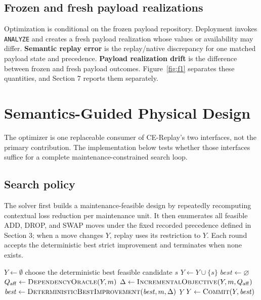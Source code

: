 \documentclass[sigconf,nonacm]{acmart}
\begin{document}
\subsection{Frozen and fresh payload realizations}

Optimization is conditional on the frozen payload repository. Deployment invokes \texttt{ANALYZE} and creates a fresh payload realization whose values or availability may differ. \textbf{Semantic replay error} is the replay/native discrepancy for one matched payload state and precedence. \textbf{Payload realization drift} is the difference between frozen and fresh payload outcomes. Figure~\ref{fig:f1} separates these quantities, and Section 7 reports them separately.

\section{Semantics-Guided Physical Design}\label{sec:6}

The optimizer is one replaceable consumer of CE-Replay's two interfaces, not the primary contribution. The implementation below tests whether those interfaces suffice for a complete maintenance-constrained search loop.

\subsection{Search policy}

The solver first builds a maintenance-feasible design by repeatedly recomputing contextual loss reduction per maintenance unit. It then enumerates all feasible ADD, DROP, and SWAP moves under the fixed recorded precedence defined in Section 3; when a move changes $Y$, replay uses its restriction to $Y$. Each round accepts the deterministic best strict improvement and terminates when none exists.

\begin{algorithm}[t]
\caption{Fixed-precedence local search using CE-Replay interfaces}
\label{alg:search}
\small
\begin{algorithmic}[1]
\State $Y \gets \emptyset$
  \State choose the deterministic best feasible candidate $s$
  \State $Y \gets Y \cup \{s\}$
  \State {}
\EndWhile
\Loop
  \State $\mathit{best} \gets \varnothing$
    \State $Q_{\mathrm{aff}} \gets \Call{DependencyOracle}{Y,m}$
    \State $\Delta \gets \Call{IncrementalObjective}{Y,m,Q_{\mathrm{aff}}}$
    \State $\mathit{best} \gets \Call{DeterministicBestImprovement}{\mathit{best},m,\Delta}$
  \EndFor
    \State \Return $Y$
  \EndIf
  \State $Y \gets \Call{Commit}{Y,\mathit{best}}$
\EndLoop
\end{algorithmic}
\end{algorithm}
\end{document}
